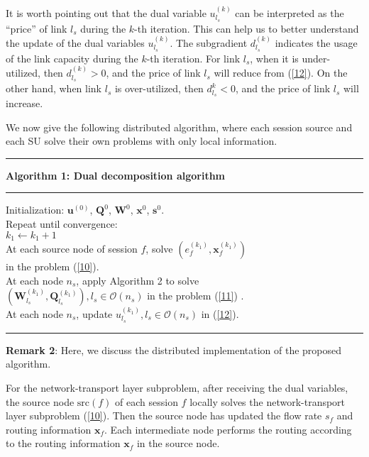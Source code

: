 \documentclass[12pt,onecolumn,tworows]{IEEEtran}
\begin{document}
It is worth pointing out that the dual variable $u_{l_s}^{(k)}$ can be interpreted as the ``price'' of link $l_s$ during the $k$-th iteration. This can help us to better understand the update of the dual variables $u_{l_s}^{(k)}$. The subgradient $d_{l_s}^{(k)}$ indicates the usage of the link capacity during the $k$-th iteration. For link $l_s$, when it is under-utilized, then $d_{{l_s}}^{(k)} > 0$, and the price of link $l_s$ will reduce from (\ref{12}). On the other hand, when link $l_s$ is over-utilized, then $d_{{l_s}}^k < 0$, and the price of link $l_s$ will increase.

We now give the following distributed algorithm, where
each session source and each SU solve their own problems with only
local information.

\noindent\rule{520pt}{1pt}
 \textbf{Algorithm 1: Dual decomposition algorithm}\\
 \noindent\rule{520pt}{0.65pt}
Initialization: ${{\mathbf{u}}^{(0)}}$, $\mathbf{Q}^{0}$, $\mathbf{W}^{0}$, $\mathbf{x}^{0}$, $\mathbf{s}^{0}$.\\
Repeat until convergence:\\
 \indent  \indent $k_{1} \leftarrow k_{1}+1$\\
 \indent  \indent At each source node of session $f$, solve $\left({e}_{f}^{(k_{1})},\mathbf{x}_{f}^{(k_{1})}\right)$ \\
  \indent  \indent in the problem (\ref{10}).\\
 \indent  \indent At each node $n_s$, apply Algorithm 2 to solve\\
 \indent  \indent $\left(\mathbf{W}_{l_s}^{(k_{1})},\mathbf{Q}_{l_s}^{(k_{1})}\right),l_s\in\mathcal{O}(n_s)$
 in the problem (\ref{11}) .\\
 \indent  \indent At each node $n_s$, update $u_{l_s}^{(k_{1})}, l_s\in\mathcal{O}(n_s)$ in (\ref{12}).\\
\noindent\rule{520pt}{1pt}

\textbf{Remark 2}: Here, we discuss the distributed implementation of the proposed algorithm.

For the network-transport layer subproblem, after receiving the dual variables, the source node $\text{src}(f)$ of each session $f$ locally solves the network-transport layer subproblem (\ref{10}).
Then the source node has updated the flow rate ${{{s}}_f}$ and routing information ${{\mathbf{x}}_f}$. Each intermediate node performs the routing according to the routing information ${{\mathbf{x}}_f}$ in the source node.
\end{document}
